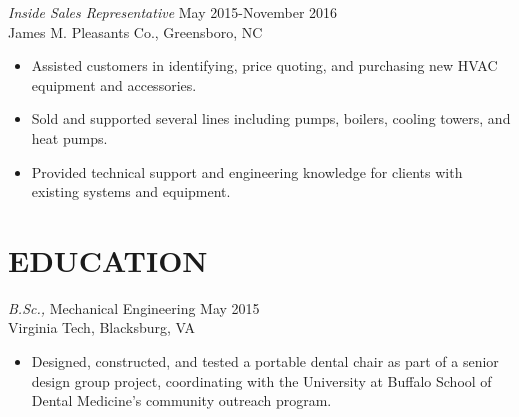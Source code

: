 \documentclass[margin]{res}
\begin{document}
\begin{resume}
    {\sl Inside Sales Representative} \hfill May 2015-November 2016 \\
 	    James M. Pleasants Co., Greensboro, NC
        \begin{itemize}  \itemsep -2pt %
            \item Assisted customers in identifying, price quoting, and purchasing new HVAC equipment and accessories.
            \item Sold and supported several lines including pumps, boilers, cooling towers, and heat pumps.
            \item Provided technical support and engineering knowledge for clients with existing systems and equipment.
            \end{itemize}
 

\section{EDUCATION} {\sl B.Sc.,} Mechanical Engineering \hfill  May 2015 \\
    Virginia Tech, Blacksburg, VA
    \begin{itemize}  \itemsep -2pt %
        \item Designed, constructed, and tested a portable dental chair as part of a senior design group project, coordinating with the University at Buffalo School of Dental Medicine's community outreach program.
    \end{itemize}
 
 


\end{resume}
\end{document}
